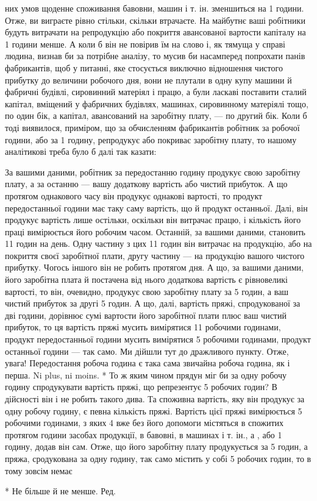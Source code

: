 них умов щоденне споживання бавовни, машин і т. ін. зменшиться на 1 години. Отже, ви виграєте
рівно стільки, скільки втрачаєте. На майбутнє ваші робітники будуть витрачати на репродукцію
або покриття авансованої вартости капіталу на 1 години менше. А коли б він не повірив їм на
слово і, як тямуща у справі людина, визнав би за потрібне аналізу, то мусив би насамперед попрохати
панів фабрикантів, щоб у питанні, яке стосується
виключно відношення чистого прибутку до величини робочого дня, вони не плутали в одну купу машини й
фабричні будівлі,
сировинний матеріял і працю, а були ласкаві поставити сталий капітал, вміщений у фабричних будівлях,
машинах, сировинному матеріялі тощо, по один бік, а капітал, авансований на заробітну
плату, — по другий бік. Коли б тоді виявилося, приміром, що за обчисленням фабрикантів робітник за
 робочої години, або за 1 годину, репродукує або покриває заробітну плату, то нашому
аналітикові треба було б далі так казати:

За вашими даними, робітник за передостанню годину продукує свою заробітну плату, а за останню — вашу
додаткову вартість або чистий прибуток. А що протягом однакового часу він продукує
однакові вартості, то продукт передостанньої години має таку
саму вартість, що й продукт останньої. Далі, він продукує вартість лише остільки, оскільки він
витрачає працю, і кількість
його праці вимірюється його робочим часом. Останній, за вашими даними, становить 11 годин на
день. Одну частину з цих 11 годин
він витрачає на продукцію, або на покриття своєї заробітної плати, другу частину — на продукцію
вашого чистого прибутку. Чогось іншого він не робить протягом дня. А що, за вашими даними, його
заробітна плата й постачена від нього додаткова вартість є рівновеликі вартості, то він, очевидно,
продукує свою заробітну плату за 5 годин, а ваш чистий прибуток за другі
5 годин. А що, далі, вартість пряжі, спродукованої за дві години, дорівнює сумі вартости його
заробітної плати плюс ваш
чистий прибуток, то ця вартість пряжі мусить вимірятися 11 робочими
годинами, продукт передостанньої години мусить вимірятися 5 робочими годинами, продукт останньої
години — так
само. Ми дійшли тут до дражливого пункту. Отже, увага! Передостання робоча година є така сама
звичайна робоча година, як і
перша. Ni plus, ni moins. * То ж яким чином прядун міг би за одну робочу годину спродукувати
вартість пряжі, що репрезентує 5 робочих годин? В дійсності він і не робить такого дива. Та
споживна вартість, яку він продукує за одну робочу годину, є певна кількість пряжі. Вартість цієї
пряжі вимірюється 5 робочими годинами, з яких 4 вже без його допомоги містяться в спожитих
протягом години засобах продукції, в бавовні, в машинах і т. ін., а , або 1 годину, додав він
сам. Отже, що його заробітну плату продукується за 5 годин, а пряжа, сродукована за одну годину,
так само містить у собі 5 робочих годин, то в тому зовсім немає

* Не більше й не менше. Ред.
